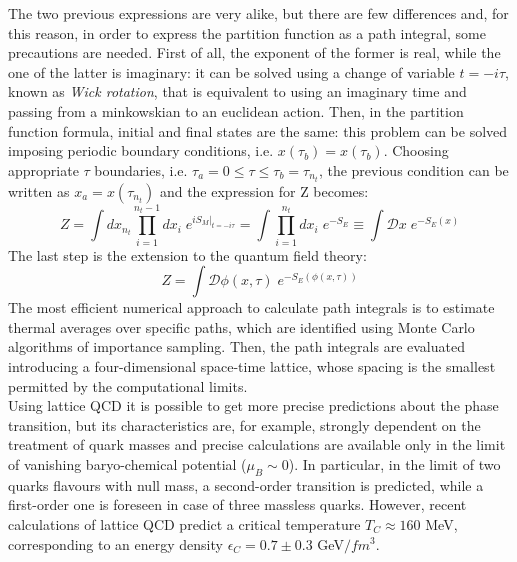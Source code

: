 The two previous expressions are very alike, but there are few differences and, for this reason, in order to express the partition function as a path integral, some precautions are needed. First of all, the exponent of the former is real, while the one of the latter is imaginary: it can be solved using a change of variable $t = -i \tau$, known as \textit{Wick rotation}, that is equivalent to using an imaginary time and passing from a minkowskian to an euclidean action. Then, in the partition function formula, initial and final states are the same: this problem can be solved imposing periodic boundary conditions, i.e. $x(\tau_{b}) = x(\tau_{b})$. Choosing appropriate $\tau$ boundaries, i.e. $\tau_{a} = 0 \leq \tau \leq \tau_{b} = \tau_{n_{t}}$, the previous condition can be written as $x_{a} = x(\tau_{n_{t}})$ and the expression for Z becomes:
%
\begin{equation}
 Z = \int dx_{n_{t}} \prod\limits_{i=1}^{n_{t}-1}dx_{i} \; e^{iS_{M}\Big|_{t=-i\tau}} = \int \prod\limits_{i=1}^{n_{t}}dx_{i} \; e^{-S_{E}} \equiv \int \mathcal{D}x \; e^{-S_{E}(x)}
\end{equation}
%
The last step is the extension to the quantum field theory:
%
\begin{equation}
 Z = \int \mathcal{D}\phi(x,\tau) \; e^{-S_{E}(\phi(x,\tau))}
\end{equation}
%
The most efficient numerical approach to calculate path integrals is to estimate thermal averages over specific paths, which are identified using Monte Carlo algorithms of importance sampling. Then, the path integrals are evaluated introducing a four-dimensional space-time lattice, whose spacing is the smallest permitted by the computational limits.\\
Using lattice QCD it is possible to get more precise predictions about the phase transition, but its characteristics are, for example, strongly dependent on the treatment of quark masses and precise calculations are available only in the limit of vanishing baryo-chemical potential ($\mu_{B}\sim0$). In particular, in the limit of two quarks flavours with null mass, a second-order transition is predicted, while a first-order one is foreseen in case of three massless quarks. However, recent calculations of lattice QCD predict a critical temperature $T_{C}\approx160$ MeV, corresponding to an energy density $\epsilon_{C} = 0.7 \pm 0.3$ GeV$/fm^{3}$\cite{lattice}.

